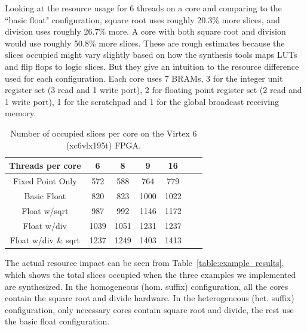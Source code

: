 Looking at the resource usage for 6 threads on a core and comparing to the ``basic float" configuration, square root uses roughly 20.3\% more slices, and division uses roughly 26.7\% more. 
A core with both square root and division would use roughly 50.8\% more slices.
These are rough estimates because the slices occupied might vary slightly based on how the synthesis tools maps LUTs and flip flops to logic slices. 
But they give an intuition to the resource difference used for each configuration.
Each core uses 7 BRAMs, 3 for the integer unit register set (3 read and 1 write port), 2 for floating point register set (2 read and 1 write port), 1 for the scratchpad and 1 for the global broadcast receiving memory.
\begin{table}
\caption{Number of occupied slices per core on the Virtex 6 (xc6vlx195t) FPGA.}
\begin{center}
\begin{tabular}{|c|c|c|c|c|c|c|}
\hline
Threads per core & 6 & 8 & 9 & 16\\ \hline
Fixed Point Only  & 572 & 588 & 764 & 779\\ \hline
Basic Float  & 820 & 823 & 1000 & 1022 \\ \hline
Float w/sqrt  & 987 & 992 & 1146 & 1172 \\  \hline
Float w/div  & 1039 & 1051 & 1231 & 1237 \\ \hline
Float w/div \& sqrt  & 1237 & 1249 & 1403 & 1413 \\ \hline
\end{tabular}
\end{center}
\label{Cores_vs_features}
\end{table}
The actual resource impact can be seen from Table~\ref{table:example_results}, which shows the total slices occupied when the three examples we implemented are synthesized.
In the homogeneous (hom. suffix) configuration, all the cores contain the square root and divide hardware.
In the heterogeneous (het. suffix) configuration, only necessary cores contain square root and divide, the rest use the basic float configuration.  
